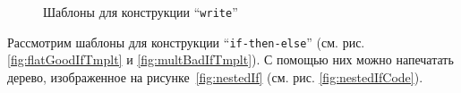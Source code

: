 \begin{figure}[h!]
	\begin{subfigure}[h]{0.45\textwidth}
		
		\caption{}
		\label{fig:writeTmplt1}
	\end{subfigure}
	\begin{subfigure}[h]{0.45\textwidth}
		
		\caption{}
		\label{fig:writeTmplt2}
	\end{subfigure}
	\caption{Шаблоны для конструкции “\lstinline{write}”}
\end{figure}



% 	



% 	

Рассмотрим шаблоны для конструкции “\lstinline{if-then-else}” (см. рис. \ref{fig:flatGoodIfTmplt} и \ref{fig:multBadIfTmplt}).
С помощью них можно напечатать дерево, изображенное на рисунке~\ref{fig:nestedIf} (см. рис. \ref{fig:nestedIfCode}).

